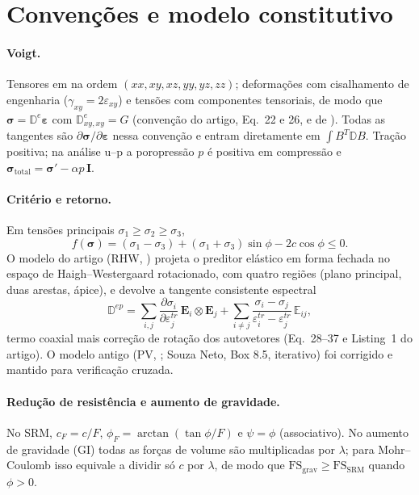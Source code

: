 \documentclass[11pt,a4paper]{article}
\newcommand{\sig}{\bm{\sigma}}
\newcommand{\eps}{\bm{\varepsilon}}
\newcommand{\D}{\mathbb{D}}
\begin{document}
\section{Convenções e modelo constitutivo}

\paragraph{Voigt.} Tensores em  na ordem $(xx,xy,xz,yy,yz,zz)$; deformações com
cisalhamento de engenharia ($\gamma_{xy}=2\varepsilon_{xy}$) e tensões com componentes tensoriais,
de modo que $\sig = \D^e\eps$ com $\D^e_{xy,xy}=G$ (convenção do artigo, Eq.~22 e 26, e de
). Todas as tangentes são $\partial\sig/\partial\eps$ nessa convenção e
entram diretamente em $\int B^T\D B$. Tração positiva; na análise u--p a poropressão $p$ é positiva em
compressão e $\sig_{\text{total}}=\sig'-\alpha p\,\mathbf I$.

\paragraph{Critério e retorno.} Em tensões principais $\sigma_1\ge\sigma_2\ge\sigma_3$,
\begin{equation}
f(\sig) = (\sigma_1-\sigma_3) + (\sigma_1+\sigma_3)\sin\phi - 2c\cos\phi \le 0 .
\end{equation}
O modelo do artigo (RHW, ) projeta o preditor elástico em
forma fechada no espaço de Haigh--Westergaard rotacionado, com quatro regiões (plano principal,
duas arestas, ápice), e devolve a tangente consistente espectral
\begin{equation}
\D^{ep} = \sum_{i,j}\frac{\partial\sigma_i}{\partial\varepsilon^{tr}_j}\,\mathbf E_i\otimes\mathbf E_j
 + \sum_{i\ne j}\frac{\sigma_i-\sigma_j}{\varepsilon^{tr}_i-\varepsilon^{tr}_j}\,\mathbb E_{ij},
\end{equation}
termo coaxial mais correção de rotação dos autovetores (Eq.~28--37 e Listing~1 do artigo). O modelo
antigo (PV, ; Souza Neto, Box 8.5, iterativo) foi corrigido e
mantido para verificação cruzada.

\paragraph{Redução de resistência e aumento de gravidade.} No SRM, $c_F=c/F$, $\phi_F=\arctan(\tan\phi/F)$
e $\psi=\phi$ (associativo). No aumento de gravidade (GI) todas as forças de volume são multiplicadas por
$\lambda$; para Mohr--Coulomb isso equivale a dividir só $c$ por $\lambda$, de modo que
$\text{FS}_{\text{grav}}\ge\text{FS}_{\text{SRM}}$ quando $\phi>0$.
\end{document}
